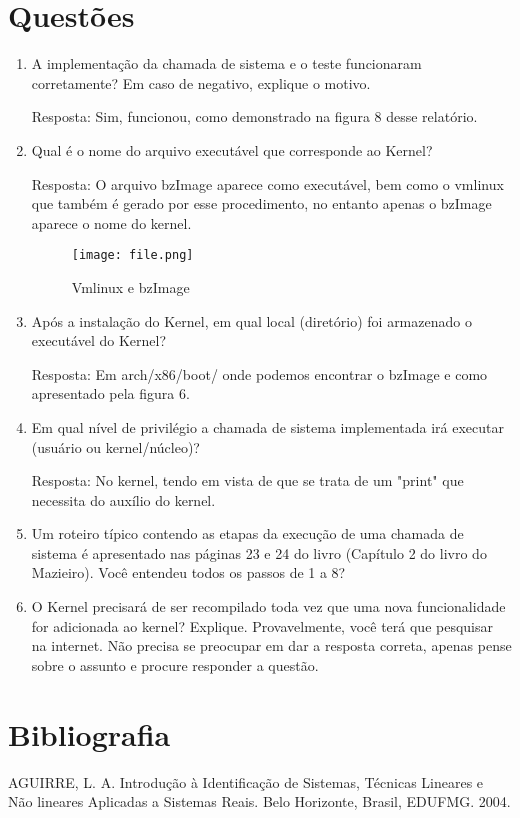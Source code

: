 \documentclass[a4paper, 12pt]{article}
\begin{document}
\section{Questões}
\begin{enumerate}
		\item A implementação da chamada de sistema e o teste funcionaram corretamente? Em caso de negativo, explique o motivo.
		
		Resposta: Sim, funcionou, como demonstrado na figura 8 desse relatório.
		
		\item Qual é o nome do arquivo executável que corresponde ao Kernel?
		
		Resposta: O arquivo bzImage aparece como executável, bem como o vmlinux que também é gerado por esse procedimento, no entanto apenas o bzImage aparece o nome do kernel.
		
		\begin{figure}[!h]
            \centering 
            \texttt{[image: file.png]}
            \label{figura:qualquernome}
            \caption{Vmlinux e bzImage}
        \end{figure}
        		
        \newpage
        
		\item Após a instalação do Kernel, em qual local (diretório) foi armazenado o executável do Kernel?
		
		Resposta: Em arch/x86/boot/ onde podemos encontrar o bzImage e como apresentado pela figura 6.
		
		\item Em qual nível de privilégio a chamada de sistema implementada irá executar (usuário ou kernel/núcleo)?
		
		Resposta: No kernel, tendo em vista de que se trata de um "print" que necessita do auxílio do kernel.
		
		\item Um roteiro típico contendo as etapas da execução de uma chamada de sistema é apresentado nas páginas 23 e 24 do livro (Capítulo 2 do livro do Mazieiro). Você entendeu todos os passos de 1 a 8?
		
		\item O Kernel precisará de ser recompilado toda vez que uma nova funcionalidade for adicionada ao kernel? Explique. Provavelmente, você terá que pesquisar na internet. Não precisa se preocupar em dar a resposta correta, apenas pense sobre o assunto e procure responder a questão.
		
	\end{enumerate}
\newpage

\section*{Bibliografia}
\footnotesize{

\noindent AGUIRRE, L. A. Introdução à Identificação de Sistemas, Técnicas Lineares e Não lineares Aplicadas a Sistemas Reais. Belo Horizonte, Brasil, EDUFMG. 2004.\\

}
\newpage
\end{document}
